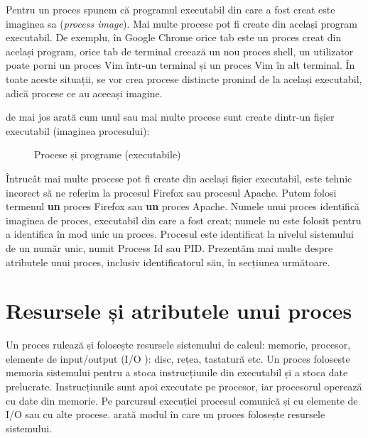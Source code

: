 Pentru un proces spunem că programul executabil din care a fost creat este
imaginea sa (\textit{process image}). Mai multe procese pot fi create din
același program executabil. De exemplu, în Google Chrome orice tab este un
proces creat din același program, orice tab de terminal creează un nou proces
shell, un utilizator poate porni un proces Vim într-un terminal și un proces Vim
în alt terminal. În toate aceste situații, se vor crea procese distincte pronind
de la același executabil, adică procese ce au aceeași imagine.

 de mai jos arată cum unul sau mai multe procese sunt create dintr-un
fișier executabil (imaginea procesului):

\begin{figure}[!htbp]
	\centering
	\def\svgwidth{0.8\textwidth}
	
	\caption{Procese și programe (executabile)}
	\label{fig:process-process-exec}
\end{figure}

Întrucât mai multe procese pot fi create din același fișier executabil, este
tehnic incorect să ne referim la procesul Firefox sau procesul Apache. Putem
folosi termenul \textbf{un} proces Firefox sau \textbf{un} proces Apache. Numele
unui proces identifică imaginea de proces, executabil din care a fost creat;
numele nu este folosit pentru a identifica în mod unic un proces. Procesul este
identificat la nivelul sistemului de un număr unic, numit Process Id sau PID. Prezentăm mai multe despre atributele unui proces,
inclusiv identificatorul său, în secțiunea următoare.

\section{Resursele și atributele unui proces}
\label{sec:procese-resurse}

Un proces rulează și folosește resursele sistemului de calcul: memorie,
procesor, elemente de input/output (I/O ): disc,
rețea, tastatură etc. Un proces folosește memoria sistemului pentru a stoca
instrucțiunile din executabil și a stoca date prelucrate. Instrucțiunile sunt
apoi executate pe procesor, iar procesorul operează cu date din memorie. Pe
parcursul execuției procesul comunică și cu elemente de I/O sau cu alte procese.
 arată modul în care un proces folosește resursele
sistemului.

